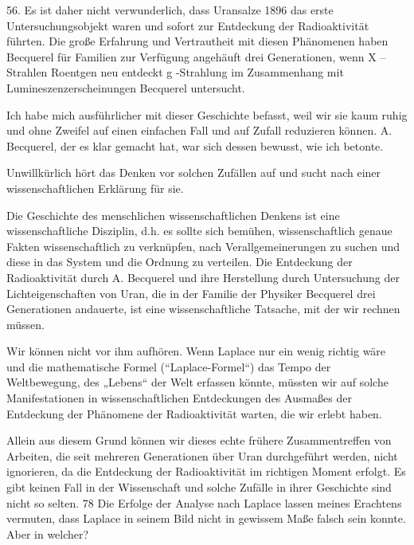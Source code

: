 \documentclass[11pt,a4paper]{book}
\begin{document}
56. Es ist daher nicht verwunderlich, dass Uransalze 1896 das erste Untersuchungsobjekt waren und sofort zur Entdeckung der Radioaktivität führten. Die große Erfahrung und Vertrautheit mit diesen Phänomenen haben Becquerel für Familien zur Verfügung angehäuft drei Generationen, wenn X -- Strahlen Roentgen neu entdeckt g -Strahlung im Zusammenhang mit Lumineszenzerscheinungen Becquerel untersucht.



Ich habe mich ausführlicher mit dieser Geschichte befasst, weil wir sie kaum ruhig und ohne Zweifel auf einen einfachen Fall und auf Zufall reduzieren können. A. Becquerel, der es klar gemacht hat, war sich dessen bewusst, wie ich betonte.



Unwillkürlich hört das Denken vor solchen Zufällen auf und sucht nach einer wissenschaftlichen Erklärung für sie.



Die Geschichte des menschlichen wissenschaftlichen Denkens ist eine wissenschaftliche Disziplin, d.h. es sollte sich bemühen, wissenschaftlich genaue Fakten wissenschaftlich zu verknüpfen, nach Verallgemeinerungen zu suchen und diese in das System und die Ordnung zu verteilen. Die Entdeckung der Radioaktivität durch A. Becquerel und ihre Herstellung durch Untersuchung der Lichteigenschaften von Uran, die in der Familie der Physiker Becquerel drei Generationen andauerte, ist eine wissenschaftliche Tatsache, mit der wir rechnen müssen.



Wir können nicht vor ihm aufhören. Wenn Laplace nur ein wenig richtig wäre und die mathematische Formel (“Laplace-Formel“) das Tempo der Weltbewegung, des „Lebens“ der Welt erfassen könnte, müssten wir auf solche Manifestationen in wissenschaftlichen Entdeckungen des Ausmaßes der Entdeckung der Phänomene der Radioaktivität warten, die wir erlebt haben.



Allein aus diesem Grund können wir dieses echte frühere Zusammentreffen von Arbeiten, die seit mehreren Generationen über Uran durchgeführt werden, nicht ignorieren, da die Entdeckung der Radioaktivität im richtigen Moment erfolgt. Es gibt keinen Fall in der Wissenschaft und solche Zufälle in ihrer Geschichte sind nicht so selten. 78 Die Erfolge der Analyse nach Laplace lassen meines Erachtens vermuten, dass Laplace in seinem Bild nicht in gewissem Maße falsch sein konnte. Aber in welcher?
\end{document}
